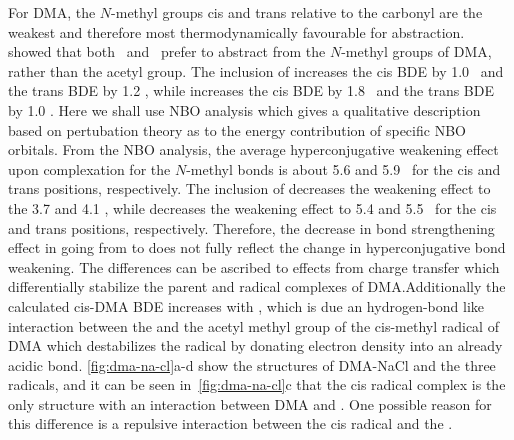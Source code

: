 For DMA, the $N$-methyl groups cis and trans relative to the carbonyl are the
weakest and therefore most thermodynamically favourable for abstraction.
\citet{Salamone2013} showed that both \bno\ and \cumo\ prefer to abstract from
the $N$-methyl groups of DMA, rather than the acetyl group. The inclusion of
 increases the cis BDE by 1.0 \kcalmol\ and the trans BDE by 1.2
\kcalmol, while  increases the cis BDE by 1.8 \kcalmol\ and the trans
BDE by 1.0 \kcalmol. Here we shall use NBO analysis which gives a qualitative
description based on pertubation theory as to the energy contribution of
specific NBO orbitals.\cite{Weinhold2016} From the NBO analysis, the average
hyperconjugative weakening effect upon complexation for the $N$-methyl 
bonds is about 5.6 and 5.9 \kcalmol\ for the cis and trans positions,
respectively. The inclusion of  decreases the weakening effect to the
3.7 and 4.1 \kcalmol, while  decreases the weakening effect to 5.4 and
5.5 \kcalmol\ for the cis and trans positions, respectively. Therefore, the
decrease in bond strengthening effect in going from  to  does
not fully reflect the change in hyperconjugative bond weakening. The
differences can be ascribed to effects from charge transfer which
differentially stabilize the parent and radical complexes of DMA.\@ Additionally
the calculated cis-DMA BDE increases with , which is due an
hydrogen-bond like interaction between the  and the acetyl methyl
group of the cis-methyl radical of DMA which destabilizes the radical by
donating electron density into an already acidic  bond.
\ref{fig:dma-na-cl}a-d show the structures of DMA-NaCl and the three radicals,
and it can be seen in~\ref{fig:dma-na-cl}c that the cis radical complex is the
only structure with an interaction between DMA and .  One possible
reason for this difference is a repulsive interaction between the cis radical
and the .


